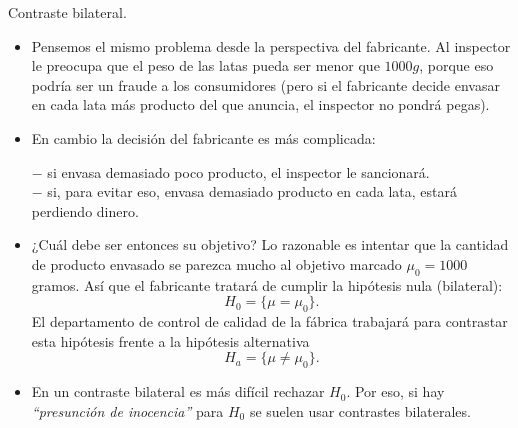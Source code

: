 \documentclass[
  9pt,
  ignorenonframetext,
]{beamer}
\begin{document}
\begin{frame}{Contraste bilateral.}
\protect\hypertarget{contraste-bilateral.}{}

\begin{itemize}
\item
  Pensemos el mismo problema desde la perspectiva del fabricante. Al
  inspector le preocupa que el peso de las latas pueda ser menor que
  \(1000g\), porque eso podría ser un fraude a los consumidores (pero si
  el fabricante decide envasar en cada lata más producto del que
  anuncia, el inspector no pondrá pegas).
\item
  En cambio la decisión del fabricante es más complicada:

  \(-\) si envasa demasiado poco producto, el inspector le sancionará.\\
  \(-\) si, para evitar eso, envasa demasiado producto en cada lata,
  estará perdiendo dinero.
\item
  ¿Cuál debe ser entonces su objetivo? Lo razonable es intentar que la
  cantidad de producto envasado se parezca mucho al objetivo marcado
  \(\mu_0=1000\) gramos. Así que el fabricante tratará de cumplir la
  hipótesis nula (bilateral): \[ H_0=\{\mu = \mu_0\}.\] El departamento
  de control de calidad de la fábrica trabajará para contrastar esta
  hipótesis frente a la hipótesis alternativa
  \[ H_a=\{\mu\neq \mu_0\}.\]
\item
  En un contraste bilateral es más difícil rechazar \(H_0\). Por eso, si
  hay \emph{``presunción de inocencia''} para \(H_0\) se suelen usar
  contrastes bilaterales.
\end{itemize}

\end{frame}
\end{document}
